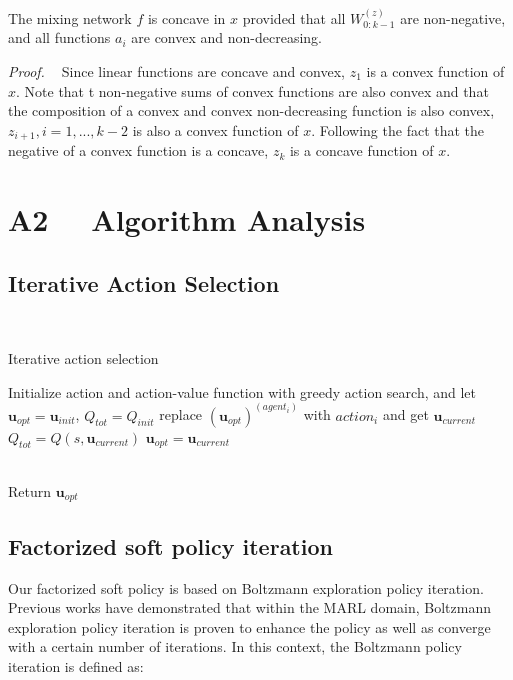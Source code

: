 \begin{theorem}
The mixing network $f$ is concave in $x$ provided that all $W^{(z)}_{0:k-1}$ are non-negative, and all functions $a_i$ are convex and non-decreasing.
\end{theorem}

\noindent\textit{Proof. \ } 
Since linear functions are concave and convex, $z_1$ is a convex function of $x$. Note that t non-negative sums of convex functions are also convex and that the composition of a convex and convex non-decreasing function is also convex, $z_{i+1}, i = 1, ..., k-2$ is also a convex function of $x$. Following the fact that the negative
of a convex function is a concave, $z_k$ is a concave function of $x$. 

\section{A2 \ \ Algorithm Analysis}

\subsection{Iterative Action Selection}
~\\
\begin{algorithm} 
	\caption{Iterative action selection} 
    \label{alg_action_selction} 
	\begin{algorithmic}
        \STATE Initialize action and action-value function with greedy action search, and let $\mathbf{u}_{opt} = \mathbf{u}_{init}$, $Q_{tot} = Q_{init}$
        \STATE replace $(\boldsymbol{u}_{opt})^{(agent_i)}$ with $action_i$ and get $\boldsymbol{u}_{current}$        
        \STATE $Q_{tot} = Q(s, \boldsymbol{u}_{current})$
        \STATE $\boldsymbol{u}_{opt} = \boldsymbol{u}_{current}$
        
        \ENDIF
        \ENDFOR
        \ENDFOR \\
        Return $\boldsymbol{u}_{opt}$
	\end{algorithmic} 
\end{algorithm}
\subsection{Factorized soft policy iteration}
Our factorized soft policy is based on Boltzmann exploration policy iteration. Previous works have demonstrated that within the MARL domain, Boltzmann exploration policy iteration is proven to enhance the policy as well as converge with a certain number of iterations. In this context, the Boltzmann policy iteration is  defined as:


